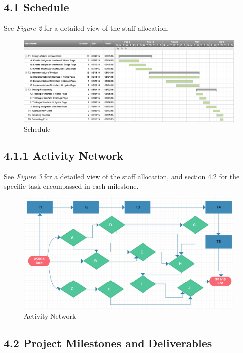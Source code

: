 \documentclass[]{article}
\begin{document}
\subsection{4.1 Schedule}\label{schedule}

See \emph{Figure 2} for a detailed view of the staff allocation.

\begin{figure}[htbp]
\centering
\includegraphics{schedule.png}
\caption{Schedule}
\end{figure}

\subsection{4.1.1 Activity Network}\label{activity-network}

See \emph{Figure 3} for a detailed view of the staff allocation, and
section 4.2 for the specific task encompassed in each milestone.

\begin{figure}[htbp]
\centering
\includegraphics{ActivityNetwork.png}
\caption{Activity Network}
\end{figure}

\subsection{4.2 Project Milestones and
Deliverables}\label{project-milestones-and-deliverables}
\end{document}
